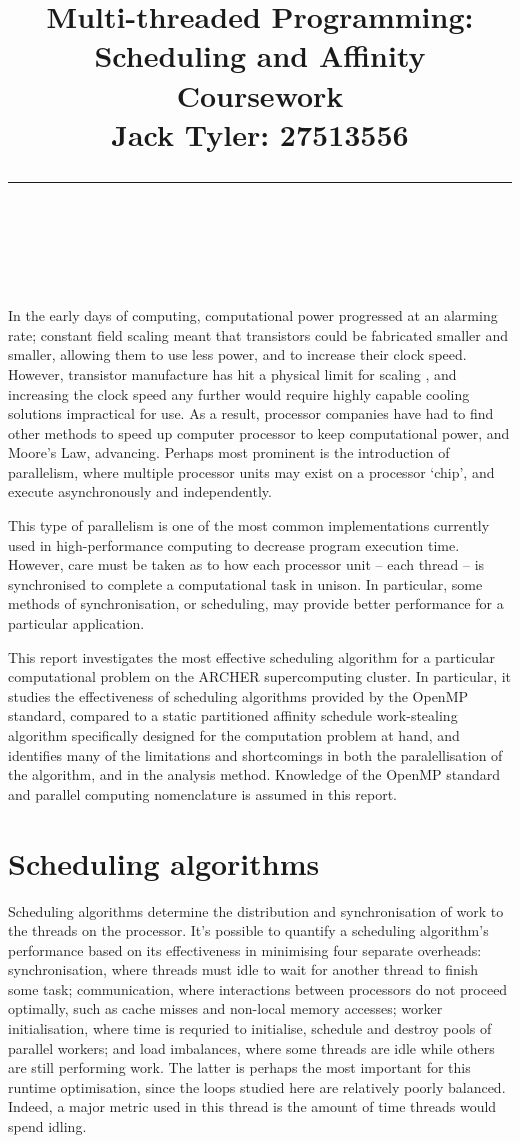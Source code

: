 \documentclass{article} %
\title{\raggedright
\normalfont \normalsize 
\huge Multi-threaded Programming: Scheduling and Affinity Coursework \\[1em]
\normalsize \normalfont Jack Tyler: 27513556 \\
\rule{\linewidth}{.5pt}  \\[6pt]
}
\begin{document}
\maketitle

In the early days of computing, computational power progressed at an alarming rate; constant field scaling meant that transistors could be fabricated smaller and smaller, allowing them to use less power, and to increase their clock speed.
However, transistor manufacture has hit a physical limit for scaling \citep{Mcfarland1995}, and increasing the clock speed any further would require highly capable cooling solutions impractical for use.
As a result, processor companies have had to find other methods to speed up computer processor to keep computational power, and Moore's Law, advancing.
Perhaps most prominent is the introduction of parallelism, where multiple processor units may exist on a processor `chip', and execute asynchronously and independently.

This type of parallelism is one of the most common implementations currently used in high-performance computing to decrease program execution time.
However, care must be taken as to how each processor unit -- each thread -- is synchronised to complete a computational task in unison. In particular,
some methods of synchronisation, or scheduling, may provide better performance for a particular application.

This report investigates the most effective scheduling algorithm for a particular computational problem on the ARCHER supercomputing cluster.
In particular, it studies the effectiveness of scheduling algorithms provided by the OpenMP standard, compared to a static partitioned affinity schedule work-stealing algorithm specifically designed for the computation problem at hand, and identifies many of the limitations and shortcomings in both the paralellisation of the algorithm, and in the analysis method. Knowledge of the OpenMP standard and parallel computing nomenclature is assumed in this report.

\section*{Scheduling algorithms}

Scheduling algorithms determine the distribution and synchronisation of work to the threads on the processor.
It's possible to quantify a scheduling algorithm's performance based on its effectiveness in minimising four separate overheads:
synchronisation, where threads must idle to wait for another thread to finish some task;
communication, where interactions between processors do not proceed optimally, such as cache misses and non-local memory accesses;
worker initialisation, where time is requried to initialise, schedule and destroy pools of parallel workers;
and load imbalances, where some threads are idle while others are still performing work.
The latter is perhaps the most important for this runtime optimisation, since the loops studied here are relatively poorly balanced.
Indeed, a major metric used in this thread is the amount of time threads would spend idling.
\end{document}
